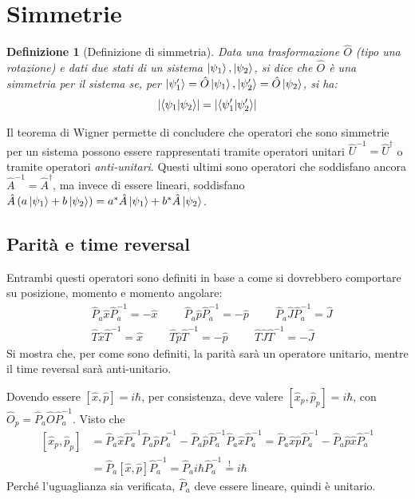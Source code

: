 \documentclass[11pt, a4paper]{scrartcl} %
\numberwithin{equation}{subsection}
\theoremstyle{style2}
\theoremstyle{style1}
\newtheorem{definizione}{Definizione}[section]
\begin{document}
\newpage
\section{Simmetrie}
\begin{definizione}[Definizione di simmetria]
Data una trasformazione $\hat{O}$ (tipo una rotazione) e dati due stati di un sistema $\ket{\psi _1} , \ket{\psi _2} $, si dice che $\hat{O}$ \`e una simmetria per il sistema se, per $\ket{\psi _1'} = \hat{O}\ket{\psi _1} , \ket{\psi _2'} = \hat{O} \ket{\psi _2} $, si ha:
\begin{equation}
	\lvert \braket{\psi _1|\psi _2}  \rvert = \lvert \braket{\psi _1'|\psi _2'}  \rvert 
\end{equation}
\end{definizione}
Il teorema di Wigner permette di concludere che operatori che sono simmetrie per un sistema possono essere rappresentati tramite operatori unitari $\hat{U} ^{-1} = \hat{U}^\dagger $ o tramite operatori \textit{anti-unitari}.
Questi ultimi sono operatori che soddisfano ancora $\hat{A}^{-1} = \hat{A}^\dagger $, ma invece di essere lineari, soddisfano $\hat{A}\left(a \ket{\psi _1} +b \ket{\psi _2}\right)  = a^* \hat{A}\ket{\psi _1} + b^* \hat{A}\ket{\psi _2} $.
\subsection{Parit\`a e time reversal}
Entrambi questi operatori sono definiti in base a come si dovrebbero comportare su posizione, momento e momento angolare:
\begin{equation}
	\begin{split}
		&\hat{P}_a \hat{x}\hat{P}_a^{-1} = - \hat{x} \hspace{1cm}\hat{P}_a \hat{p}\hat{P}_a^{-1} = - \hat{p} \hspace{1cm} \hat{P}_a \hat{J}\hat{P}_a^{-1} =  \hat{J} \\
		&\hat{T} \hat{x}\hat{T}^{-1} =  \hat{x} \hspace{1cm}\hat{T} \hat{p}\hat{T}^{-1} = - \hat{p} \hspace{1cm} \hat{T} \hat{J}\hat{T}^{-1} =  - \hat{J} 
	\end{split}
\end{equation}
Si mostra che, per come sono definiti, la parit\`a sar\`a un operatore unitario, mentre il time reversal sar\`a anti-unitario.

Dovendo essere $[\hat{x},\hat{p}] = i \hbar $, per consistenza, deve valere $[\hat{x}_p , \hat{p}_p] = i \hbar $, con $\hat{O}_p = \hat{P}_a \hat{O}\hat{P}_a^{-1}$. 
Visto che
\[
	\begin{split}
		[\hat{x}_p, \hat{p}_p] &= \hat{P}_a \hat{x}\hat{P}_a^{-1}\hat{P}_a \hat{p}\hat{P}_a^{-1} -  \hat{P}_a \hat{p}\hat{P}_a^{-1}\hat{P}_a \hat{x}\hat{P}_a^{-1} = \hat{P}_a \hat{x} \hat{p}\hat{P}_a^{-1} -  \hat{P}_a \hat{p}\hat{x}\hat{P}_a^{-1}\\
				       &= \hat{P}_a [\hat{x},\hat{p}] \hat{P}_a^{-1} = \hat{P}_a i \hbar \hat{P}_a^{-1} \stackrel{!}{=} i\hbar 
	\end{split}
\] 
Perch\'e l'uguaglianza sia verificata, $\hat{P}_a $ deve essere lineare, quindi \`e unitario.
\end{document}
